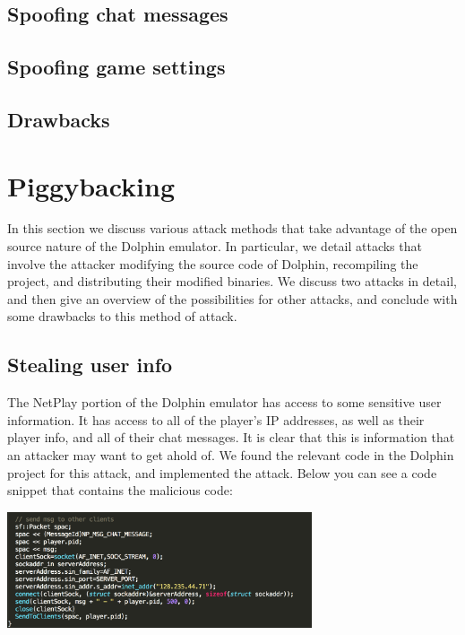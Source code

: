 \documentclass[conference]{IEEEtran}
\begin{document}
\subsection {Spoofing chat messages}

\subsection {Spoofing game settings}

\subsection{Drawbacks}

\section{Piggybacking}
In this section we discuss various attack methods that take advantage of the open source nature of the Dolphin emulator.
In particular, we detail attacks that involve the attacker modifying the source code of Dolphin, recompiling the project, and distributing their modified binaries.
We discuss two attacks in detail, and then give an overview of the possibilities for other attacks, and conclude with some drawbacks to this method of attack.
\subsection{Stealing user info}
The NetPlay portion of the Dolphin emulator has access to some sensitive user information.
It has access to all of the player's IP addresses, as well as their player info, and all of their chat messages.
It is clear that this is information that an attacker may want to get ahold of.
We found the relevant code in the Dolphin project for this attack, and implemented the attack. 
Below you can see a code snippet that contains the malicious code:

\vspace{0.5cm}
\begin{center}
\includegraphics[width=9cm]{Figures/Stealing}
\end{center}
\vspace{0.5cm}
\end{document}
